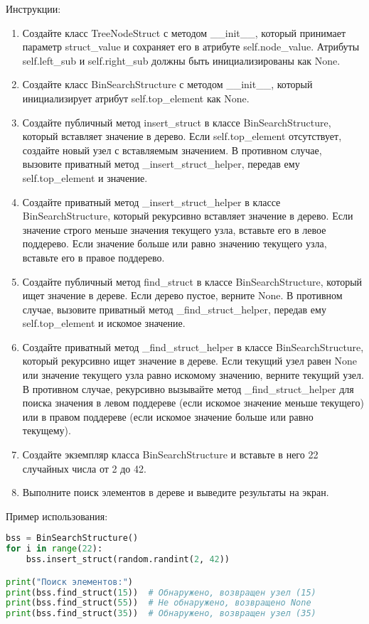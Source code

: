 \begin{enumerate}
Инструкции:
\begin{enumerate}
    \item Создайте класс TreeNodeStruct с методом \_\_init\_\_, который принимает параметр struct\_value и сохраняет его в атрибуте self.node\_value. Атрибуты self.left\_sub и self.right\_sub должны быть инициализированы как None.
    \item Создайте класс BinSearchStructure с методом \_\_init\_\_, который инициализирует атрибут self.top\_element как None.
    \item Создайте публичный метод insert\_struct в классе BinSearchStructure, который вставляет значение в дерево. Если self.top\_element отсутствует, создайте новый узел с вставляемым значением. В противном случае, вызовите приватный метод \_insert\_struct\_helper, передав ему self.top\_element и значение.
    \item Создайте приватный метод \_insert\_struct\_helper в классе BinSearchStructure, который рекурсивно вставляет значение в дерево. Если значение строго меньше значения текущего узла, вставьте его в левое поддерево. Если значение больше или равно значению текущего узла, вставьте его в правое поддерево.
    \item Создайте публичный метод find\_struct в классе BinSearchStructure, который ищет значение в дереве. Если дерево пустое, верните None. В противном случае, вызовите приватный метод \_find\_struct\_helper, передав ему self.top\_element и искомое значение.
    \item Создайте приватный метод \_find\_struct\_helper в классе BinSearchStructure, который рекурсивно ищет значение в дереве. Если текущий узел равен None или значение текущего узла равно искомому значению, верните текущий узел. В противном случае, рекурсивно вызывайте метод \_find\_struct\_helper для поиска значения в левом поддереве (если искомое значение меньше текущего) или в правом поддереве (если искомое значение больше или равно текущему).
    \item Создайте экземпляр класса BinSearchStructure и вставьте в него 22 случайных числа от 2 до 42.
    \item Выполните поиск элементов в дереве и выведите результаты на экран.
\end{enumerate}

Пример использования:
\begin{lstlisting}[language=Python]
bss = BinSearchStructure()
for i in range(22):
    bss.insert_struct(random.randint(2, 42))

print("Поиск элементов:")
print(bss.find_struct(15))  # Обнаружено, возвращен узел (15)
print(bss.find_struct(55))  # Не обнаружено, возвращено None
print(bss.find_struct(35))  # Обнаружено, возвращен узел (35)
\end{lstlisting}


\end{enumerate}
